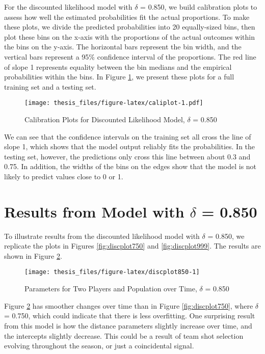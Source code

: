 \documentclass[12pt,twoside]{dukestatscithesis}
\theoremstyle{definition}
\theoremstyle{definition}
\theoremstyle{definition}
\theoremstyle{remark}
\begin{document}
For the discounted likelihood model with \(\delta\) = 0.850, we build
calibration plots to assess how well the estimated probabilities fit the
actual proportions. To make these plots, we divide the predicted
probabilities into 20 equally-sized bins, then plot these bins on the
x-axis with the proportions of the actual outcomes within the bins on
the y-axis. The horizontal bars represent the bin width, and the
vertical bars represent a 95\% confidence interval of the proportions.
The red line of slope 1 represents equality between the bin medians and
the empirical probabilities within the bins. In Figure
\ref{fig:caliplot}, we present these plots for a full training set and a
testing set.
\begin{figure}[htbp]
\centering
\texttt{[image: thesis\_files/figure-latex/caliplot-1.pdf]}
\caption{\label{fig:caliplot}Calibration Plots for Discounted Likelihood
Model, \(\delta\) = 0.850}
\end{figure}
\pagebreak

We can see that the confidence intervals on the training set all cross
the line of slope 1, which shows that the model output reliably fits the
probabilities. In the testing set, however, the predictions only cross
this line between about 0.3 and 0.75. In addition, the widths of the
bins on the edges show that the model is not likely to predict values
close to 0 or 1.

\section{\texorpdfstring{Results from Model with \(\delta\) =
0.850}{Results from Model with \textbackslash{}delta = 0.850}}\label{results-from-model-with-delta-0.850}

To illustrate results from the discounted likelihood model with
\(\delta\) = 0.850, we replicate the plots in Figures
\ref{fig:discplot750} and \ref{fig:discplot999}. The results are shown
in Figure \ref{fig:discplot850}.
\begin{figure}

\hfill{}\texttt{[image: thesis\_files/figure-latex/discplot850-1]} 

\caption{Parameters for Two Players and Population over Time, $\delta$ = 0.850}\label{fig:discplot850}
\end{figure}
Figure \ref{fig:discplot850} has smoother changes over time than in
Figure \ref{fig:discplot750}, where \(\delta\) = 0.750, which could
indicate that there is less overfitting. One surprising result from this
model is how the distance parameters slightly increase over time, and
the intercepts slightly decrease. This could be a result of team shot
selection evolving throughout the season, or just a coincidental signal.
\end{document}
